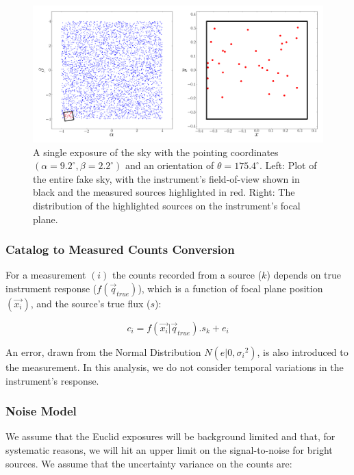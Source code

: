 \documentclass[manuscript]{aastex}
\begin{document}
\begin{figure}[ht]
\begin{center}
\includegraphics[width=\textwidth]{camera_image.png}
\end{center}
\caption{A single exposure of the sky with the pointing coordinates $(\alpha = 9.2^\circ, \beta = 2.2^\circ)$ and an orientation of $\theta = 175.4^\circ$. Left: Plot of the entire fake sky, with the instrument's field-of-view shown in black and the measured sources highlighted in red. Right: The distribution of the highlighted sources on the instrument's focal plane. \label{fig:camera}}
\end{figure}

\subsubsection{Catalog to Measured Counts Conversion}
For a measurement $(i)$ the counts recorded from a source ($k$) depends on true instrument response ($f(\vec{q}_{true})$), which is a function of focal plane position $(\vec{x_i})$, and the source's true flux ($s$): 

\begin{displaymath}
c_i = f(\vec{x_i} | \vec{q}_{true}) . s_{k} + e_{i}
\end{displaymath}

\noindent{}An error, drawn from the Normal Distribution $N(e|0,{\sigma_i}^2)$, is also introduced to the measurement. In this analysis, we do not consider temporal variations in the instrument's response. 

\subsubsection{Noise Model}
\label{sec:noise_model}
We assume that the Euclid exposures will be background limited and that, for systematic reasons, we will hit an upper limit on the signal-to-noise for bright sources. We assume that the uncertainty variance on the counts are:
\end{document}

